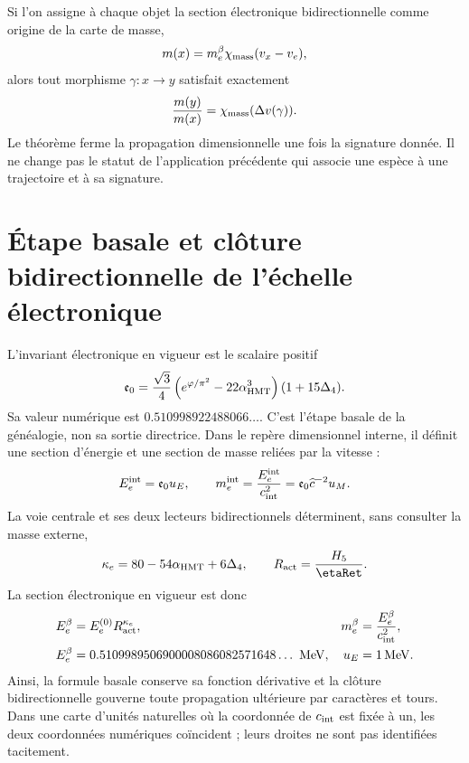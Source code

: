 Si l'on assigne à chaque objet la section électronique bidirectionnelle comme
origine de la carte de masse,
\[
 m(x)=m_e^{\beta}\chi_{\rm mass}(v_x-v_e),
\]
alors tout morphisme \(\gamma:x\to y\) satisfait exactement
\[
 \frac{m(y)}{m(x)}
 =\chi_{\rm mass}(\Delta v(\gamma)).
\]
Le théorème ferme la propagation dimensionnelle une fois la signature donnée. Il ne change pas
le statut de l'application précédente qui associe une espèce à une trajectoire et à
sa signature.

\section{Étape basale et clôture bidirectionnelle de l'échelle électronique}

L'invariant électronique en vigueur est le scalaire positif
\[
 \mathfrak e_0=
 \frac{\sqrt3}{4}
 \left(e^{\varphi/\pi^2}-22\alpha_{\rm HMT}^3\right)
 (1+15\Delta_4).
\]
Sa valeur numérique est
\(0.510998922488066\ldots\). C'est l'étape basale de la généalogie, non sa
sortie directrice. Dans le repère dimensionnel interne, il définit une section d'énergie
et une section de masse reliées par la vitesse :
\begin{equation}
 E_e^{\rm int}=\mathfrak e_0u_E,
 \qquad
 m_e^{\rm int}=\frac{E_e^{\rm int}}{c_{\rm int}^{2}}
 =\mathfrak e_0\widehat c^{-2}u_M.
 \label{eq:electron-line-valued}
\end{equation}
La voie centrale et ses deux lecteurs bidirectionnels déterminent, sans consulter
la masse externe,
\[
 \kappa_e=80-54\alpha_{\rm HMT}+6\Delta_4,
 \qquad R_{\rm act}=\frac{H_5}{\etaRet}.
\]
La section électronique en vigueur est donc
\begin{equation}
 \begin{aligned}
 E_e^{\beta}&=E_e^{(0)}R_{\rm act}^{\kappa_e},
 &m_e^{\beta}&=\frac{E_e^{\beta}}{c_{\rm int}^{2}},\\
 E_e^\beta
 &=0.5109989506900008086082571648\ldots\ {\rm MeV},
 &u_E&=1\,{\rm MeV}.
 \end{aligned}
 \label{eq:electron-line-valued-beta}
\end{equation}
Ainsi, la formule basale conserve sa fonction dérivative et la clôture
bidirectionnelle gouverne toute propagation ultérieure par caractères et tours.
Dans une carte d'unités naturelles où la coordonnée de
\(c_{\rm int}\) est fixée à un, les deux coordonnées numériques coïncident ; leurs
droites ne sont pas identifiées tacitement.

